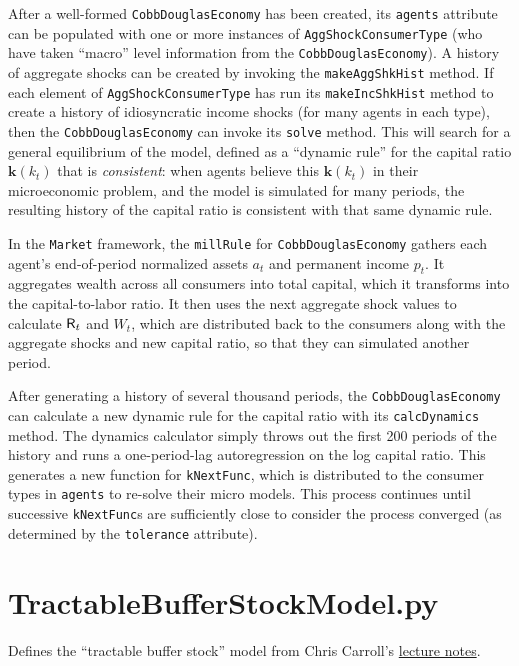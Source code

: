 \documentclass[12pt,titlepage,letterpaper]{econtex}
\begin{document}
After a well-formed \texttt{CobbDouglasEconomy} has been created, its \texttt{agents} attribute can be populated with one or more instances of \texttt{AggShockConsumerType} (who have taken ``macro'' level information from the \texttt{CobbDouglasEconomy}).  A history of aggregate shocks can be created by invoking the \texttt{makeAggShkHist} method.  If each element of \texttt{AggShockConsumerType} has run its \texttt{makeIncShkHist} method to create a history of idiosyncratic income shocks (for many agents in each type), then the \texttt{CobbDouglasEconomy} can invoke its \texttt{solve} method.  This will search for a general equilibrium of the model, defined as a ``dynamic rule'' for the capital ratio $\textbf{k}(k_t)$ that is \textit{consistent}: when agents believe this $\textbf{k}(k_t)$ in their microeconomic problem, and the model is simulated for many periods, the resulting history of the capital ratio is consistent with that same dynamic rule.

In the \texttt{Market} framework, the \texttt{millRule} for \texttt{CobbDouglasEconomy} gathers each agent's end-of-period normalized assets $a_t$ and permanent income $p_t$.  It aggregates wealth across all consumers into total capital, which it transforms into the capital-to-labor ratio.  It then uses the next aggregate shock values to calculate $\mathsf{R}_t$ and $W_t$, which are distributed back to the consumers along with the aggregate shocks and new capital ratio, so that they can simulated another period.

After generating a history of several thousand periods, the \texttt{CobbDouglasEconomy} can calculate a new dynamic rule for the capital ratio with its \texttt{calcDynamics} method.  The dynamics calculator simply throws out the first 200 periods of the history and runs a one-period-lag autoregression on the log capital ratio.  This generates a new function for \texttt{kNextFunc}, which is distributed to the consumer types in \texttt{agents} to re-solve their micro models.  This process continues until successive \texttt{kNextFunc}s are sufficiently close to consider the process converged (as determined by the \texttt{tolerance} attribute).


\newpage
\section{TractableBufferStockModel.py}

Defines the ``tractable buffer stock'' model from Chris Carroll's \href{http://www.econ2.jhu.edu/people/ccarroll/public/LectureNotes/Consumption/TractableBufferStock.pdf}{lecture notes}.
\end{document}
